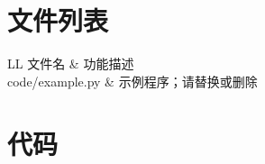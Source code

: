\begin{appendices}
\section{文件列表}
\begin{table}[H]
  \centering
  \caption{支撑材料文件列表}
  \label{tab:file-list}
  \begin{tabularx}{\textwidth}{LL}
    \toprule
    文件名 & 功能描述 \\
    \midrule
    code/example.py & 示例程序；请替换或删除 \\
    \bottomrule
  \end{tabularx}
\end{table}

\section{代码}
% 
\end{appendices}
